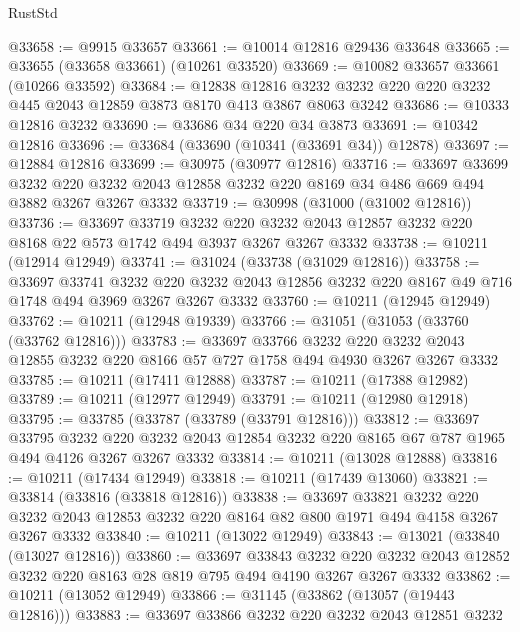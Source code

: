 \begin{lexlean}{RustStd}
\begin{coremodule}
@33658 := @9915 @33657
@33661 := @10014 @12816 @29436 @33648
@33665 := @33655 (@33658 @33661) (@10261 @33520)
@33669 := @10082 @33657 @33661 (@10266 @33592)
@33684 := @12838
    @12816
    @3232
    @3232
    @220
    @220
    @3232
    @445
    @2043
    @12859
    @3873
    @8170
    @413
    @3867
    @8063
    @3242
@33686 := @10333 @12816 @3232
@33690 := @33686 @34 @220 @34 @3873
@33691 := @10342 @12816
@33696 := @33684 (@33690 (@10341 (@33691 @34)) @12878)
@33697 := @12884 @12816
@33699 := @30975 (@30977 @12816)
@33716 := @33697
    @33699
    @3232
    @220
    @3232
    @2043
    @12858
    @3232
    @220
    @8169
    @34
    @486
    @669
    @494
    @3882
    @3267
    @3267
    @3332
@33719 := @30998 (@31000 (@31002 @12816))
@33736 := @33697
    @33719
    @3232
    @220
    @3232
    @2043
    @12857
    @3232
    @220
    @8168
    @22
    @573
    @1742
    @494
    @3937
    @3267
    @3267
    @3332
@33738 := @10211 (@12914 @12949)
@33741 := @31024 (@33738 (@31029 @12816))
@33758 := @33697
    @33741
    @3232
    @220
    @3232
    @2043
    @12856
    @3232
    @220
    @8167
    @49
    @716
    @1748
    @494
    @3969
    @3267
    @3267
    @3332
@33760 := @10211 (@12945 @12949)
@33762 := @10211 (@12948 @19339)
@33766 := @31051 (@31053 (@33760 (@33762 @12816)))
@33783 := @33697
    @33766
    @3232
    @220
    @3232
    @2043
    @12855
    @3232
    @220
    @8166
    @57
    @727
    @1758
    @494
    @4930
    @3267
    @3267
    @3332
@33785 := @10211 (@17411 @12888)
@33787 := @10211 (@17388 @12982)
@33789 := @10211 (@12977 @12949)
@33791 := @10211 (@12980 @12918)
@33795 := @33785 (@33787 (@33789 (@33791 @12816)))
@33812 := @33697
    @33795
    @3232
    @220
    @3232
    @2043
    @12854
    @3232
    @220
    @8165
    @67
    @787
    @1965
    @494
    @4126
    @3267
    @3267
    @3332
@33814 := @10211 (@13028 @12888)
@33816 := @10211 (@17434 @12949)
@33818 := @10211 (@17439 @13060)
@33821 := @33814 (@33816 (@33818 @12816))
@33838 := @33697
    @33821
    @3232
    @220
    @3232
    @2043
    @12853
    @3232
    @220
    @8164
    @82
    @800
    @1971
    @494
    @4158
    @3267
    @3267
    @3332
@33840 := @10211 (@13022 @12949)
@33843 := @13021 (@33840 (@13027 @12816))
@33860 := @33697
    @33843
    @3232
    @220
    @3232
    @2043
    @12852
    @3232
    @220
    @8163
    @28
    @819
    @795
    @494
    @4190
    @3267
    @3267
    @3332
@33862 := @10211 (@13052 @12949)
@33866 := @31145 (@33862 (@13057 (@19443 @12816)))
@33883 := @33697
    @33866
    @3232
    @220
    @3232
    @2043
    @12851
    @3232

\end{coremodule}
\end{lexlean}
